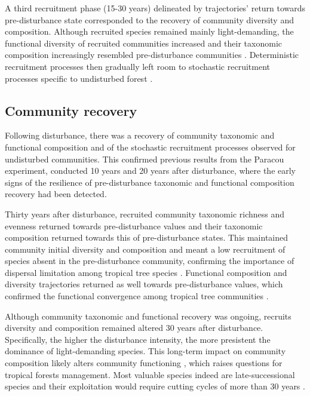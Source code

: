 \documentclass[fleqn,10pt]{ArtEcoFoG} %
\begin{document}
A third recruitment phase (15-30 years) delineated by trajectories'
return towards pre-disturbance state corresponded to the recovery of
community diversity and composition. Although recruited species remained
mainly light-demanding, the functional diversity of recruited
communities increased and their taxonomic composition increasingly
resembled pre-disturbance communities \citep{Fortunel2014}.
Deterministic recruitment processes then gradually left room to
stochastic recruitment processes specific to undisturbed forest
\citep{Lawton1988, Chave2004}.

\subsection{Community recovery}\label{community-recovery}

Following disturbance, there was a recovery of community taxonomic and
functional composition and of the stochastic recruitment processes
observed for undisturbed communities. This confirmed previous results
from the Paracou experiment, conducted 10 years \citep{Molino2001} and
20 years \citep{Baraloto2012a} after disturbance, where the early signs
of the resilience of pre-disturbance taxonomic and functional
composition recovery had been detected.

Thirty years after disturbance, recruited community taxonomic richness
and evenness returned towards pre-disturbance values and their taxonomic
composition returned towards this of pre-disturbance states. This
maintained community initial diversity and composition and meant a low
recruitment of species absent in the pre-disturbance community,
confirming the importance of dispersal limitation among tropical tree
species \citep{Svenning2005}. Functional composition and diversity
trajectories returned as well towards pre-disturbance values, which
confirmed the functional convergence among tropical tree communities
\citep{Fukami2005, Fortunel2014}.

Although community taxonomic and functional recovery was ongoing,
recruits diversity and composition remained altered 30 years after
disturbance. Specifically, the higher the disturbance intensity, the
more presistent the dominance of light-demanding species. This long-term
impact on community composition likely alters community functioning
\citep{Diaz2005}, which raises questions for tropical forests
management. Most valuable species indeed are late-successional species
and their exploitation would require cutting cycles of more than 30
years \citep{Putz2012}.
\end{document}
